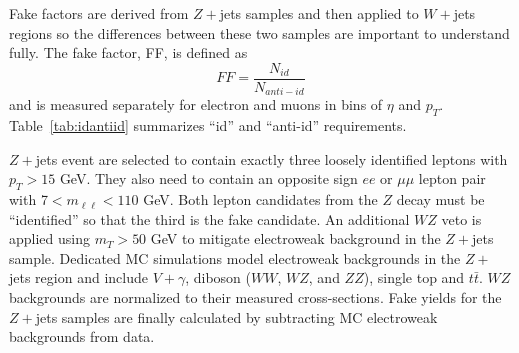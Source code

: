Fake factors are derived from $Z+$jets samples and then applied to $W+$jets regions so the differences between these two samples are important to understand fully. The fake factor, FF, is defined as
\begin{equation}
FF = \frac{N_{id}}{N_{anti-id}}
\end{equation}
and is measured separately for electron and muons in bins of $\eta$ and $p_T$. Table~\ref{tab:idantiid} summarizes ``id'' and ``anti-id'' requirements. 
\begin{table}[tb]
\caption{Requirements for ``identified'' and ``anti-identified'' electrons and muons.}
\label{tab:idantiid}
\end{table}
$Z+$jets event are selected to contain exactly three loosely identified leptons with $p_T>15$ GeV. They also need to contain an opposite sign $ee$ or $\mu\mu$ lepton pair with 7$< m_{\ell\ell} < 110$ GeV. Both lepton candidates from the $Z$ decay must be ``identified'' so that the third is the fake candidate. An additional $WZ$ veto is applied using $m_T>50$ GeV to mitigate electroweak background in the $Z+$jets sample. Dedicated MC simulations model electroweak backgrounds in the $Z+$jets region and include $V+\gamma$, diboson ($WW$, $WZ$, and $ZZ$), single top and $t\bar{t}$. $WZ$ backgrounds are normalized to their measured cross-sections. Fake yields for the $Z+$jets samples are finally calculated by subtracting MC electroweak backgrounds from data. 

